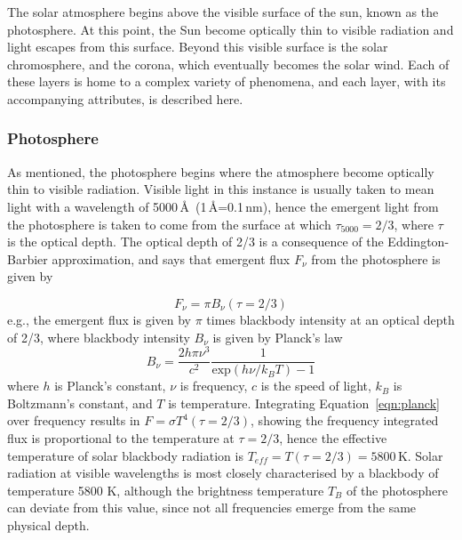 The solar atmosphere begins above the visible surface of the sun, known as the photosphere. At this point, the Sun become optically thin to visible radiation and light escapes from this surface. Beyond this visible surface is the solar chromosphere, and the corona, which eventually becomes the solar wind. Each of these layers is home to a complex variety of phenomena, and each layer, with its accompanying attributes, is described here.


\subsubsection{Photosphere}\label{sec:121}

As mentioned, the photosphere begins where the atmosphere become optically thin to visible radiation. Visible light in this instance is usually taken to mean light with a wavelength of 5000\,\AA~(1\,\AA=0.1\,nm), hence the emergent light from the photosphere is taken to come from the surface at which $\tau_{5000}=2/3$, where $\tau$ is the optical depth. The optical depth of 2/3 is a consequence of the Eddington-Barbier approximation, and says that emergent flux $F_{\nu}$ from the photosphere is given by

\begin{equation}
F_\nu = \pi B_\nu(\tau=2/3)
\end{equation}
e.g., the emergent flux is given by $\pi$ times blackbody intensity at an optical depth of 2/3, where blackbody intensity $B_\nu$ is given by Planck's law 
\begin{equation}
B_\nu = \frac{2h\pi\nu^3}{c^2}\frac{1}{\mathrm{exp}(h\nu/k_BT)-1}
\label{eqn:planck}
\end{equation}
where $h$ is Planck's constant, $\nu$ is frequency, $c$ is the speed of light, $k_B$ is Boltzmann's constant, and $T$ is temperature. Integrating Equation~\ref{eqn:planck} over frequency results in $F = \sigma T^4(\tau=2/3)$, showing the frequency integrated flux is proportional to the temperature at $\tau=2/3$, hence the effective temperature of solar blackbody radiation is $T_{eff}=T(\tau=2/3)=5800$\,K. Solar radiation at visible wavelengths is most closely characterised by a blackbody of temperature 5800 K, although the brightness temperature $T_B$ of the photosphere can deviate from this value, since not all frequencies emerge from the same physical depth.

